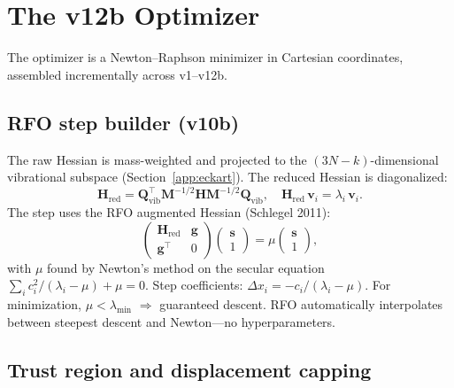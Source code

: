 \documentclass[11pt,a4paper]{article}
\newcommand{\vect}[1]{\bm{#1}}
\newcommand{\mat}[1]{\mathbf{#1}}
\theoremstyle{definition}
\begin{document}
\section{The v12b Optimizer}
\label{app:optimizer}

The optimizer is a Newton--Raphson minimizer in Cartesian coordinates,
assembled incrementally across v1--v12b.

\subsection{RFO step builder (v10b)}

The raw Hessian is mass-weighted and projected to the $(3N{-}k)$-dimensional
vibrational subspace (Section~\ref{app:eckart}).  The reduced Hessian is
diagonalized:
\begin{equation}
  \mat{H}_\text{red} = \mat{Q}_\text{vib}^\top \mat{M}^{-1/2}\mat{H}\mat{M}^{-1/2} \mat{Q}_\text{vib},
  \quad
  \mat{H}_\text{red}\,\vect{v}_i = \lambda_i\,\vect{v}_i.
\end{equation}
The step uses the RFO augmented Hessian (Schlegel 2011):
\begin{equation}
  \begin{pmatrix} \mat{H}_\text{red} & \vect{g} \\
                  \vect{g}^\top & 0 \end{pmatrix}
  \begin{pmatrix} \vect{s} \\ 1 \end{pmatrix}
  = \mu \begin{pmatrix} \vect{s} \\ 1 \end{pmatrix},
\end{equation}
with $\mu$ found by Newton's method on the secular equation
$\sum_i c_i^2/(\lambda_i - \mu) + \mu = 0$.
Step coefficients: $\Delta x_i = -c_i / (\lambda_i - \mu)$.
For minimization, $\mu < \lambda_\text{min}$ $\Rightarrow$ guaranteed
descent.  RFO automatically interpolates between steepest descent and
Newton---no hyperparameters.

\subsection{Trust region and displacement capping}
\end{document}
